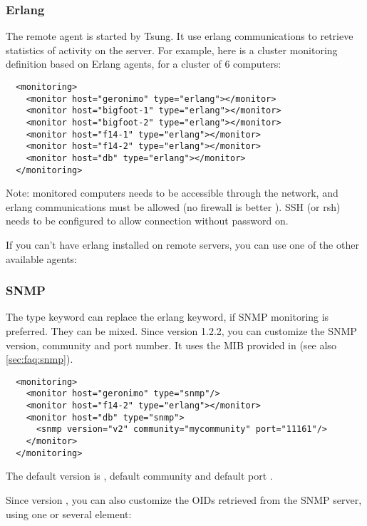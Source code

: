 \documentclass{TSUNG-en}
\begin{document}
\subsubsection{Erlang}

The remote agent is started by Tsung. It use erlang communications to
retrieve statistics of activity on the server. For example, here is a
cluster monitoring definition based on Erlang agents, for a cluster of
6 computers:

\begin{Verbatim}
  <monitoring>
    <monitor host="geronimo" type="erlang"></monitor>
    <monitor host="bigfoot-1" type="erlang"></monitor>
    <monitor host="bigfoot-2" type="erlang"></monitor>
    <monitor host="f14-1" type="erlang"></monitor>
    <monitor host="f14-2" type="erlang"></monitor>
    <monitor host="db" type="erlang"></monitor>
  </monitoring>
\end{Verbatim}


Note: monitored computers needs to be
accessible through the network, and erlang communications must be
allowed (no firewall is better ). SSH (or rsh) needs to be configured to
allow connection without password on. 

If you can't have erlang installed on remote servers, you can use one
of the other available agents:

\subsubsection{SNMP}
The type keyword  can replace the erlang keyword, if SNMP monitoring
is preferred. They can be mixed. Since version 1.2.2, you can customize the SNMP version,
community and port number. It uses the MIB provided in
 (see also \ref{sec:faq:snmp}).

\begin{Verbatim}
  <monitoring>
    <monitor host="geronimo" type="snmp"/>
    <monitor host="f14-2" type="erlang"></monitor>
    <monitor host="db" type="snmp">
      <snmp version="v2" community="mycommunity" port="11161"/>
    </monitor>
  </monitoring>
\end{Verbatim}

The default version is , default community
 and default port .

Since version , you can also customize the OIDs
retrieved from the SNMP server, using one or several 
element:
\end{document}
